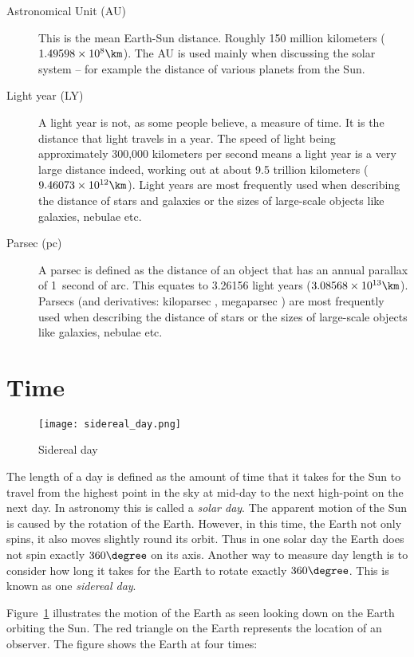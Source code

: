 \begin{description}
\item[Astronomical Unit (AU)] This is the mean Earth-Sun
  distance. Roughly 150 million kilometers
  ($1.49598 \times 10^8\km$). The AU is used mainly when
  discussing the solar system -- for example the distance of various
  planets from the Sun.
\item[Light year (LY)] A light year is not, as some people believe, a
  measure of time. It is the distance that light travels in a
  year. The speed of light being approximately 300,000 kilometers per
  second means a light year is a very large distance indeed, working
  out at about 9.5 trillion kilometers
  ($9.46073\times10^{12}\km$). Light years are most frequently used
  when describing the distance of stars and galaxies or the sizes of
  large-scale objects like galaxies, nebulae etc.
\item[Parsec (pc)] A parsec is defined as the distance of an object
  that has an annual parallax of 1~second of arc. This equates to
  3.26156 light years ($3.08568\times10^{13}\km$). Parsecs (and derivatives: kiloparsec \kpc, megaparsec \Mpc) are most
  frequently used when describing the distance of stars or the sizes
  of large-scale objects like galaxies, nebulae etc.
\end{description}

\section{Time}
\label{sec:Concepts:Time}

\begin{figure}[ht]
\centering\texttt{[image: sidereal\_day.png]}
\caption{Sidereal day}
\label{fig:SiderealDay}
\end{figure}

The length of a day is defined as the amount of time that it takes for
the Sun to travel from the highest point in the sky at mid-day to the
next high-point on the next day. In astronomy this is called a
\emph{solar day}. The apparent motion of the Sun is caused by the
rotation of the Earth. However, in this time, the Earth not only spins,
it also moves slightly round its orbit. Thus in one solar day the Earth
does not spin exactly $360\degree$ on its axis. Another way to measure day
length is to consider how long it takes for the Earth to rotate exactly
$360\degree$. This is known as one \emph{sidereal day}.

Figure~\ref{fig:SiderealDay} illustrates the motion of the Earth as
seen looking down on the Earth orbiting the Sun. The red triangle on the
Earth represents the location of an observer. The figure shows the Earth
at four times:

